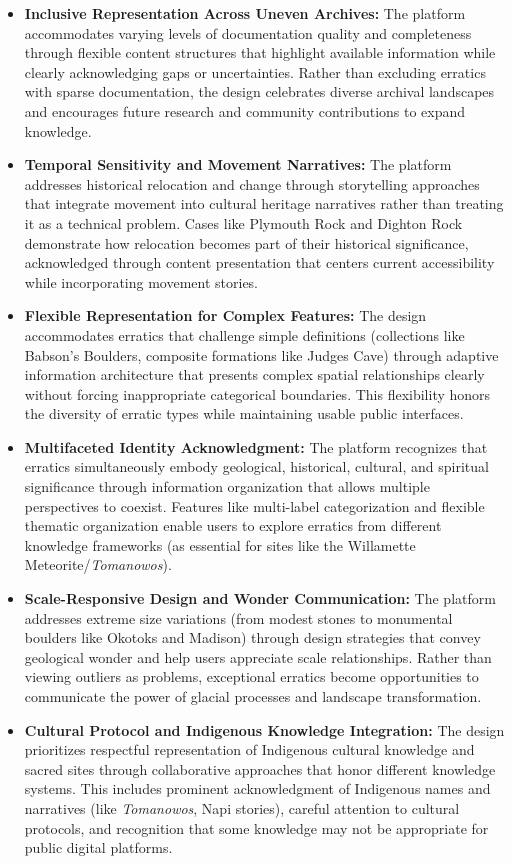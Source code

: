 \begin{itemize}
    \item \textbf{Inclusive Representation Across Uneven Archives:} The platform accommodates varying levels of documentation quality and completeness through flexible content structures that highlight available information while clearly acknowledging gaps or uncertainties. Rather than excluding erratics with sparse documentation, the design celebrates diverse archival landscapes and encourages future research and community contributions to expand knowledge.
    \item \textbf{Temporal Sensitivity and Movement Narratives:} The platform addresses historical relocation and change through storytelling approaches that integrate movement into cultural heritage narratives rather than treating it as a technical problem. Cases like Plymouth Rock and Dighton Rock demonstrate how relocation becomes part of their historical significance, acknowledged through content presentation that centers current accessibility while incorporating movement stories.
    \item \textbf{Flexible Representation for Complex Features:} The design accommodates erratics that challenge simple definitions (collections like Babson's Boulders, composite formations like Judges Cave) through adaptive information architecture that presents complex spatial relationships clearly without forcing inappropriate categorical boundaries. This flexibility honors the diversity of erratic types while maintaining usable public interfaces.
    \item \textbf{Multifaceted Identity Acknowledgment:} The platform recognizes that erratics simultaneously embody geological, historical, cultural, and spiritual significance through information organization that allows multiple perspectives to coexist. Features like multi-label categorization and flexible thematic organization enable users to explore erratics from different knowledge frameworks (as essential for sites like the Willamette Meteorite/\emph{Tomanowos}).
    \item \textbf{Scale-Responsive Design and Wonder Communication:} The platform addresses extreme size variations (from modest stones to monumental boulders like Okotoks and Madison) through design strategies that convey geological wonder and help users appreciate scale relationships. Rather than viewing outliers as problems, exceptional erratics become opportunities to communicate the power of glacial processes and landscape transformation.
    \item \textbf{Cultural Protocol and Indigenous Knowledge Integration:} The design prioritizes respectful representation of Indigenous cultural knowledge and sacred sites through collaborative approaches that honor different knowledge systems. This includes prominent acknowledgment of Indigenous names and narratives (like \emph{Tomanowos}, Napi stories), careful attention to cultural protocols, and recognition that some knowledge may not be appropriate for public digital platforms.
\end{itemize}
